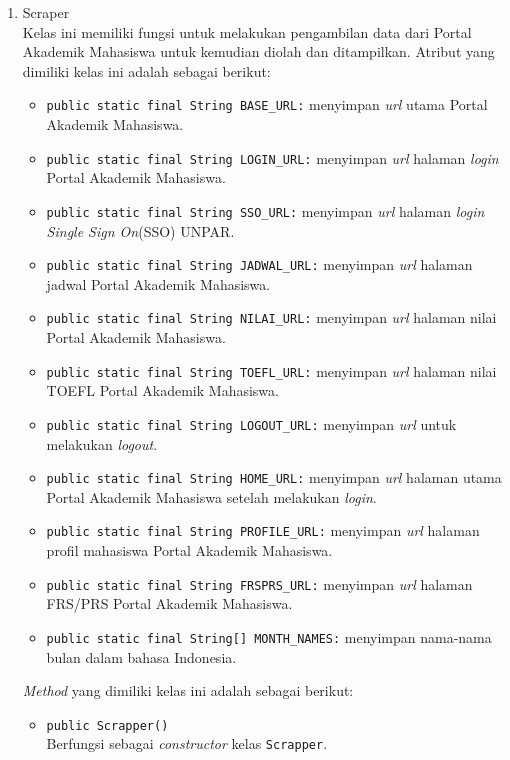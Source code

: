\begin{enumerate}
	\item Scraper\\
	Kelas ini memiliki fungsi untuk melakukan pengambilan data dari Portal Akademik Mahasiswa untuk kemudian diolah dan ditampilkan. Atribut yang dimiliki kelas ini adalah sebagai berikut:
	\begin{itemize}
        \item \texttt{public static final String BASE\_URL:} menyimpan \textit{url} utama Portal Akademik Mahasiswa.
        \item \texttt{public static final String LOGIN\_URL:} menyimpan \textit{url}  halaman \textit{login} Portal Akademik Mahasiswa.
        \item \texttt{public static final String SSO\_URL:} menyimpan \textit{url}  halaman \textit{login} \textit{Single Sign On}(SSO) UNPAR.
        \item \texttt{public static final String JADWAL\_URL:} menyimpan \textit{url}  halaman jadwal Portal Akademik Mahasiswa.
        \item \texttt{public static final String NILAI\_URL:} menyimpan \textit{url}  halaman nilai Portal Akademik Mahasiswa.
        \item \texttt{public static final String TOEFL\_URL:} menyimpan \textit{url}  halaman nilai TOEFL Portal Akademik Mahasiswa.
        \item \texttt{public static final String LOGOUT\_URL:} menyimpan \textit{url}  untuk melakukan \textit{logout}.
        \item \texttt{public static final String HOME\_URL:} menyimpan \textit{url}  halaman utama Portal Akademik Mahasiswa setelah melakukan \textit{login}.
        \item \texttt{public static final String PROFILE\_URL:} menyimpan \textit{url}  halaman profil mahasiswa Portal Akademik Mahasiswa.
        \item \texttt{public static final String FRSPRS\_URL:} menyimpan \textit{url}  halaman FRS/PRS Portal Akademik Mahasiswa.
        \item \texttt{public static final String[] MONTH\_NAMES:} menyimpan nama-nama bulan dalam bahasa Indonesia.
	\end{itemize}
	
	\textit{Method} yang dimiliki kelas ini adalah sebagai berikut:
	\begin{itemize}
		
		\item \texttt{public Scrapper()}\\
			Berfungsi sebagai \textit{constructor} kelas \texttt{Scrapper}.
			

\end{itemize}
\end{enumerate}
